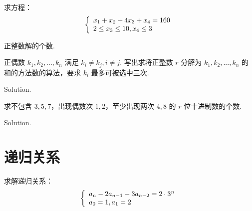 \documentclass[cn, hazy, blue, normal, 12pt]{elegantnote}
\begin{document}
\begin{exercise}

    求方程：
    \begin{equation}
        \notag
        \left\{\begin{array}{l}
            x_{1}+x_{2}+4 x_{3}+x_{4}=160 \\
            2 \leq x_{3} \leq 10, x_{4} \leq 3
        \end{array}\right.
    \end{equation}

    正整数解的个数.

\end{exercise}

\begin{exercise}

    正偶数 $k_1, k_2, ..., k_n$ 满足 $k_i \neq k_j, i \neq j$. 写出求将正整数 $r$ 分解为 $k_1, k_2, ..., k_n$ 的和的方法数的算法，要求 $k_i$ 最多可被选中三次.

\end{exercise}

\begin{solution}[print=true]

    Solution.

\end{solution}

\begin{exercise}

    求不包含 $3, 5, 7$，出现偶数次 $1, 2$，至少出现两次 $4, 8$ 的 $r$ 位十进制数的个数.

\end{exercise}

\begin{solution}[print=true]

    Solution.

\end{solution}


\section{递归关系}

\begin{exercise}

    求解递归关系：
    \begin{equation}
        \notag
        \left\{\begin{array}{l}
            a_{n}-2 a_{n-1}-3 a_{n-2} = 2 \cdot 3^{n} \\
            a_{0}=1, a_{1}=2
        \end{array}\right.
    \end{equation}

\end{exercise}
\end{document}
